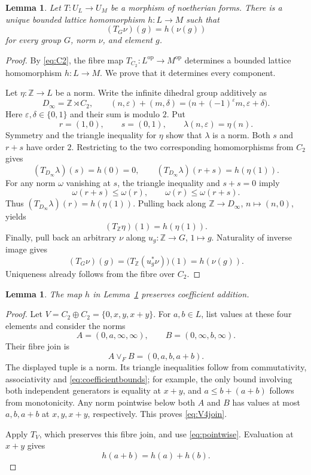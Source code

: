 \documentclass[12pt,a4paper]{amsart}
\newtheorem{lemma}[theorem]{Lemma}
\theoremstyle{definition}
\newcommand{\op}{\mathrm{op}}
\newcommand{\eps}{\varepsilon}
\newcommand{\Z}{\mathbb Z}
\begin{document}
\begin{lemma}\label{lem:pointwise}
Let $T:U_L\to U_M$ be a morphism of noetherian forms. There is a unique bounded lattice homomorphism $h:L\to M$ such that
\begin{equation}\label{eq:pointwise}
                             (T_G\nu)(g)=h(\nu(g))
\end{equation}
for every group $G$, norm $\nu$, and element $g$.
\end{lemma}
\begin{proof}
By \eqref{eq:C2}, the fibre map $T_{C_2}:L^{\op}\to M^{\op}$ determines a bounded lattice homomorphism $h:L\to M$. We prove that it determines every component.

Let $\eta:\Z\to L$ be a norm. Write the infinite dihedral group additively as
\[
 D_\infty=\Z\rtimes C_2,\qquad
 (n,\eps)+(m,\delta)=
 \bigl(n+(-1)^\eps m,\eps+\delta\bigr).
\]
Here $\eps,\delta\in\{0,1\}$ and their sum is modulo $2$. Put
\[
 r=(1,0),\qquad s=(0,1),\qquad
 \lambda(n,\eps)=\eta(n).
\]
Symmetry and the triangle inequality for $\eta$ show that $\lambda$ is a norm.
Both $s$ and $r+s$ have order $2$. Restricting to the two corresponding homomorphisms from $C_2$ gives
\[
                (T_{D_\infty}\lambda)(s)=h(0)=0,\qquad
                (T_{D_\infty}\lambda)(r+s)=h(\eta(1)).
\]
For any norm $\omega$ vanishing at $s$, the triangle inequality and $s+s=0$ imply
\[
                  \omega(r+s)\leq\omega(r),\qquad
                  \omega(r)\leq\omega(r+s).
\]
Thus $(T_{D_\infty}\lambda)(r)=h(\eta(1))$. Pulling back along
$\Z\to D_\infty$, $n\mapsto(n,0)$, yields
\[
                              (T_\Z\eta)(1)=h(\eta(1)).
\]
Finally, pull back an arbitrary $\nu$ along $u_g:\Z\to G$, $1\mapsto g$.
Naturality of inverse image gives
\[
 (T_G\nu)(g)
 =\bigl(T_\Z(u_g^*\nu)\bigr)(1)
 =h(\nu(g)).
\]
Uniqueness already follows from the fibre over $C_2$.
\end{proof}

\begin{lemma}\label{lem:addition}
The map $h$ in Lemma~\ref{lem:pointwise} preserves coefficient addition.
\end{lemma}
\begin{proof}
Let $V=C_2\oplus C_2=\{0,x,y,x+y\}$. For $a,b\in L$, list values at these four elements and consider the norms
\[
                         A=(0,a,\infty,\infty),\qquad
                         B=(0,\infty,b,\infty).
\]
Their fibre join is
\begin{equation}\label{eq:V4join}
                             A\vee_F B=(0,a,b,a+b).
\end{equation}
The displayed tuple is a norm. Its triangle inequalities follow from commutativity, associativity and \eqref{eq:coefficientbounds}; for example, the only bound involving both independent generators is equality at $x+y$, and $a\leq b+(a+b)$ follows from monotonicity.
Any norm pointwise below both $A$ and $B$ has values at most $a,b,a+b$ at $x,y,x+y$, respectively. This proves \eqref{eq:V4join}.

Apply $T_V$, which preserves this fibre join, and use \eqref{eq:pointwise}. Evaluation at $x+y$ gives
\[
                                  h(a+b)=h(a)+h(b).
\]
\end{proof}
\end{document}
